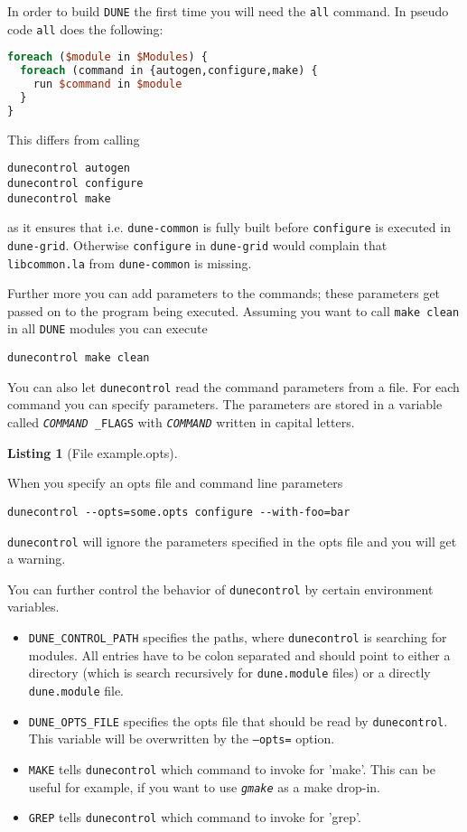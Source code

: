 \documentclass[11pt,a4paper,headinclude,footinclude,DIV16,normalheadings]{scrartcl}
\newtheorem{lst}{Listing}
\newcommand{\dune}{\texttt{DUNE}\xspace}
\newcommand{\configure}{\texttt{configure}\xspace}
\newcommand{\dunecommon}{\texttt{dune-common}\xspace}
\newcommand{\dunegrid}{\texttt{dune-grid}\xspace}
\newcommand{\dunecontrol}{\texttt{dunecontrol}\xspace}
\begin{document}
In order to build \dune the first time you will need the \texttt{all}
command. In pseudo code \texttt{all} does the following:
\begin{lstlisting}[language=Perl]
foreach ($module in $Modules) {
  foreach (command in {autogen,configure,make) {
    run $command in $module
  }
}
\end{lstlisting}

This differs from calling
\begin{lstlisting}
dunecontrol autogen
dunecontrol configure
dunecontrol make
\end{lstlisting}
as it ensures that i.e. \dunecommon is fully built before \configure
is executed in \dunegrid. Otherwise \configure in \dunegrid would
complain that \texttt{libcommon.la} from \dunecommon is missing.

Further more you can add parameters to the commands; these parameters
get passed on to the program being executed. Assuming you want to call
\texttt{make clean} in all \dune modules you can execute
\begin{lstlisting}
dunecontrol make clean
\end{lstlisting}

You can also let \dunecontrol read the command parameters from a file.
For each command you can specify parameters. The parameters are stored
in a variable called \texttt{\textit{COMMAND}\,\_FLAGS} with
\texttt{\textit{COMMAND}} written in capital letters.

\begin{lst}[File example.opts] \mbox{}

\end{lst}

When you specify an opts file and command line parameters
\begin{lstlisting}
dunecontrol --opts=some.opts configure --with-foo=bar
\end{lstlisting}
\dunecontrol will ignore the parameters specified in the opts file and
you will get a warning.

You can further control the behavior of \dunecontrol by certain
environment variables.
\begin{itemize}
\item \texttt{DUNE\_CONTROL\_PATH} specifies the paths, where
  \dunecontrol is searching for modules. All entries have to be colon
  separated and should point to either a directory (which is search
  recursively for \texttt{dune.module} files) or a directly
  \texttt{dune.module} file.
\item \texttt{DUNE\_OPTS\_FILE} specifies the opts file that should be
  read by \dunecontrol. This variable will be overwritten by the
  \texttt{--opts=} option.
\item \texttt{MAKE} tells \dunecontrol which command to invoke for
  'make'. This can be useful for example, if you want to use
  \texttt{\textit{gmake}} as a make drop-in.
\item \texttt{GREP} tells \dunecontrol which command to invoke for 'grep'.
\end{itemize}
\end{document}
